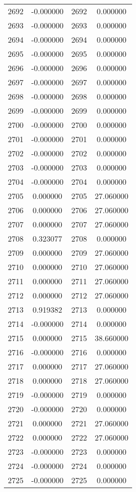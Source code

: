 \documentclass[12pt]{article}
\begin{document}
\begin{longtable}{@{}cccc@{}}
2692 & -0.000000 & 2692 & 0.000000 \\
2693 & -0.000000 & 2693 & 0.000000 \\
2694 & -0.000000 & 2694 & 0.000000 \\
2695 & -0.000000 & 2695 & 0.000000 \\
2696 & -0.000000 & 2696 & 0.000000 \\
2697 & -0.000000 & 2697 & 0.000000 \\
2698 & -0.000000 & 2698 & 0.000000 \\
2699 & -0.000000 & 2699 & 0.000000 \\
2700 & -0.000000 & 2700 & 0.000000 \\
2701 & -0.000000 & 2701 & 0.000000 \\
2702 & -0.000000 & 2702 & 0.000000 \\
2703 & -0.000000 & 2703 & 0.000000 \\
2704 & -0.000000 & 2704 & 0.000000 \\
2705 & 0.000000 & 2705 & 27.060000 \\
2706 & 0.000000 & 2706 & 27.060000 \\
2707 & 0.000000 & 2707 & 27.060000 \\
2708 & 0.323077 & 2708 & 0.000000 \\
2709 & 0.000000 & 2709 & 27.060000 \\
2710 & 0.000000 & 2710 & 27.060000 \\
2711 & 0.000000 & 2711 & 27.060000 \\
2712 & 0.000000 & 2712 & 27.060000 \\
2713 & 0.919382 & 2713 & 0.000000 \\
2714 & -0.000000 & 2714 & 0.000000 \\
2715 & 0.000000 & 2715 & 38.660000 \\
2716 & -0.000000 & 2716 & 0.000000 \\
2717 & 0.000000 & 2717 & 27.060000 \\
2718 & 0.000000 & 2718 & 27.060000 \\
2719 & -0.000000 & 2719 & 0.000000 \\
2720 & -0.000000 & 2720 & 0.000000 \\
2721 & 0.000000 & 2721 & 27.060000 \\
2722 & 0.000000 & 2722 & 27.060000 \\
2723 & -0.000000 & 2723 & 0.000000 \\
2724 & -0.000000 & 2724 & 0.000000 \\
2725 & -0.000000 & 2725 & 0.000000 \\

\end{longtable}
\end{document}
